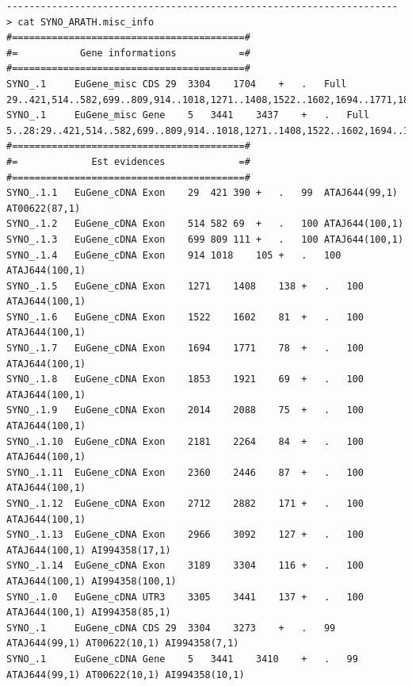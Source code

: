 \documentclass[a4paper,titlepage]{report}
\begin{document}
\begin{Verbatim}[fontsize=\scriptsize]
---------------------------------------------------------------------
> cat SYNO_ARATH.misc_info
#=========================================#
#=           Gene informations           =#
#=========================================#
SYNO_.1  	EuGene_misc	CDS	29	3304	1704	+	.	Full	29..421,514..582,699..809,914..1018,1271..1408,1522..1602,1694..1771,1853..1921,2014..2088,2181..2264,2360..2446,2712..2882,2966..3092,3189..3304
SYNO_.1  	EuGene_misc	Gene	5	3441	3437	+	.	Full	5..28:29..421,514..582,699..809,914..1018,1271..1408,1522..1602,1694..1771,1853..1921,2014..2088,2181..2264,2360..2446,2712..2882,2966..3092,3189..3304:3305..3441
#=========================================#
#=             Est evidences             =#
#=========================================#
SYNO_.1.1	EuGene_cDNA	Exon	29	421	390	+	.	99	ATAJ644(99,1) AT00622(87,1) 
SYNO_.1.2	EuGene_cDNA	Exon	514	582	69	+	.	100	ATAJ644(100,1) 
SYNO_.1.3	EuGene_cDNA	Exon	699	809	111	+	.	100	ATAJ644(100,1) 
SYNO_.1.4	EuGene_cDNA	Exon	914	1018	105	+	.	100	ATAJ644(100,1) 
SYNO_.1.5	EuGene_cDNA	Exon	1271	1408	138	+	.	100	ATAJ644(100,1) 
SYNO_.1.6	EuGene_cDNA	Exon	1522	1602	81	+	.	100	ATAJ644(100,1) 
SYNO_.1.7	EuGene_cDNA	Exon	1694	1771	78	+	.	100	ATAJ644(100,1) 
SYNO_.1.8	EuGene_cDNA	Exon	1853	1921	69	+	.	100	ATAJ644(100,1) 
SYNO_.1.9	EuGene_cDNA	Exon	2014	2088	75	+	.	100	ATAJ644(100,1) 
SYNO_.1.10	EuGene_cDNA	Exon	2181	2264	84	+	.	100	ATAJ644(100,1) 
SYNO_.1.11	EuGene_cDNA	Exon	2360	2446	87	+	.	100	ATAJ644(100,1) 
SYNO_.1.12	EuGene_cDNA	Exon	2712	2882	171	+	.	100	ATAJ644(100,1) 
SYNO_.1.13	EuGene_cDNA	Exon	2966	3092	127	+	.	100	ATAJ644(100,1) AI994358(17,1) 
SYNO_.1.14	EuGene_cDNA	Exon	3189	3304	116	+	.	100	ATAJ644(100,1) AI994358(100,1) 
SYNO_.1.0	EuGene_cDNA	UTR3	3305	3441	137	+	.	100	ATAJ644(100,1) AI994358(85,1) 
SYNO_.1  	EuGene_cDNA	CDS	29	3304	3273	+	.	99	ATAJ644(99,1) AT00622(10,1) AI994358(7,1) 
SYNO_.1  	EuGene_cDNA	Gene	5	3441	3410	+	.	99	ATAJ644(99,1) AT00622(10,1) AI994358(10,1) 
 
\end{Verbatim}

\end{document}
